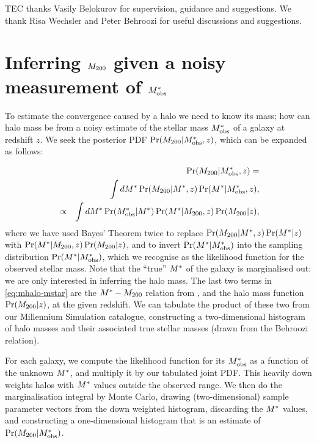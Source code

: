 \documentclass[useAMS,usenatbib,a4paper]{mn2e}
\begin{document}
TEC thanks Vasily Belokurov for supervision, guidance and suggestions.
We thank Risa Wechsler and Peter Behroozi 
for useful discussions and suggestions.



\appendix


\section{Inferring $M_{200}$ given a noisy measurement of $M^{*}_{\rm obs}$}
\label{appendix:MSMH}

To estimate the convergence caused by a halo we need to know its mass; how can 
halo mass be \infered from a noisy estimate of the stellar mass $M^{*}_{\rm obs}$
of a galaxy at redshift $z$. We seek the posterior
PDF $\Pr(M_{200}|M^{*}_{\rm obs},z)$, which can be expanded as follows:

\begin{eqnarray}
&& \Pr(M_{200}|M^{*}_{\rm obs},z) = \notag\\
&& \int dM^{*} \Pr(M_{200}|M^{*},z) \Pr(M^{*}|M^{*}_{\rm obs},z), \notag\\
&\propto& \int dM^{*} \Pr(M^{*}_{\rm obs}|M^{*}) \Pr(M^{*}|M_{200},z) \Pr(M_{200}|z),
\label{eq:mhalo-mstar}
\end{eqnarray}
where we have used Bayes' Theorem twice to replace
$\Pr(M_{200}|M^{*},z) \Pr(M^{*}|z)$ with 
$\Pr(M^{*}|M_{200},z) \Pr(M_{200}|z)$, and 
to invert $\Pr(M^{*}|M^{*}_{\rm obs})$ into the sampling
distribution $\Pr(M^{*}|M^{*}_{\rm obs})$, which we recognise as the likelihood
function for the observed stellar mass. Note that the ``true'' $M^{*}$ of the
galaxy is marginalised out: we are only interested in inferring the halo
mass. The last two terms in
\eqref{eq:mhalo-mstar} are the $M^{*}-M_{200}$ relation from
\citet{BehrooziEtal2010}, and the halo mass function $\Pr(M_{200}|z)$, at the
given redshift. We can
tabulate the product of these two from our Millennium Simulation catalogue,
constructing a two-dimensional histogram of halo masses and their associated
true stellar masses (drawn from the Behroozi relation). 

For each galaxy, we compute the likelihood function for its $M^{*}_{\rm obs}$ as a
function of the unknown $M^{*}$, and multiply it by our tabulated joint PDF.
This heavily down weights halos with $M^{*}$ values outside the observed
range. We then do the marginalisation integral by Monte Carlo, drawing
(two-dimensional) sample parameter vectors
from the down weighted histogram, discarding the $M^{*}$ values, and
constructing a one-dimensional histogram that is an estimate of
$\Pr(M_{200}|M^{*}_{\rm obs})$.
\end{document}
